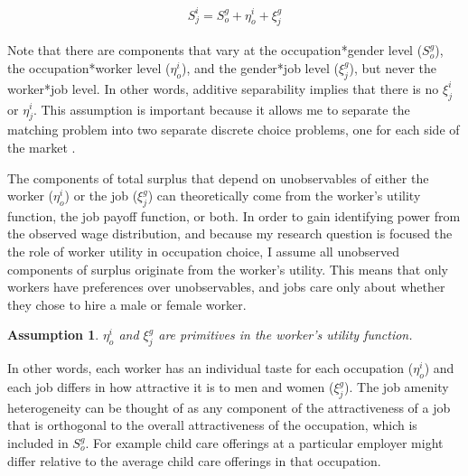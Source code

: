 \documentclass[11pt]{article}
\newtheorem{assumption}{Assumption}
\begin{document}
\begin{align}
S^i_j = S^g_o + \eta^i_o + \xi^g_j
\end{align}


Note that there are components that vary at the occupation*gender level ($S^g_o$), the occupation*worker level ($\eta^i_o$), and the gender*job level ($\xi^g_j$), but never the worker*job level. In other words, additive separability implies that there is no $\xi^i_j$ or $\eta^i_j$. This assumption is important because it allows me to separate the matching problem into two separate discrete choice problems, one for each side of the market \cite{Galichon2013}.

The components of total surplus that depend on unobservables of either the worker ($\eta^i_o$) or the job ($\xi^g_j$) can theoretically come from the worker's utility function, the job payoff function, or both. In order to gain identifying power from the observed wage distribution, and because my research question is focused the the role of worker utility in occupation choice, I assume all unobserved components of surplus originate from the worker's utility. This means that only workers have preferences over unobservables, and jobs care only about whether they chose to hire a male or female worker.

\begin{assumption}
$\eta^i_o$ and $\xi^g_j$ are primitives in the worker's utility function.
\end{assumption}

In other words, each worker has an individual taste for each occupation ($\eta^i_o$) and each job differs in how attractive it is to men and women ($\xi^g_j$). The job amenity heterogeneity can be thought of as any component of the attractiveness of a job that is orthogonal to the overall attractiveness of the occupation, which is included in $S^g_o$. For example child care offerings at a particular employer might differ relative to the average child care offerings in that occupation.


\end{document}
